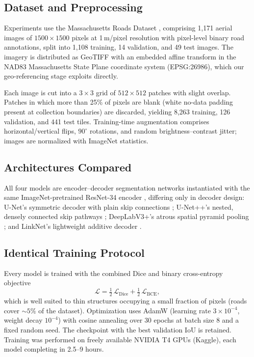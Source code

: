 \documentclass[conference]{IEEEtran}
\begin{document}
\subsection{Dataset and Preprocessing}
Experiments use the Massachusetts Roads Dataset \cite{mnih2013thesis},
comprising 1{,}171 aerial images of $1500\times1500$ pixels at 1\,m/pixel
resolution with pixel-level binary road annotations, split into 1{,}108
training, 14 validation, and 49 test images. The imagery is distributed as
GeoTIFF with an embedded affine transform in the NAD83 Massachusetts State
Plane coordinate system (EPSG:26986), which our geo-referencing stage exploits
directly.

Each image is cut into a $3\times3$ grid of $512\times512$ patches with slight
overlap. Patches in which more than 25\% of pixels are blank (white no-data
padding present at collection boundaries) are discarded, yielding 8{,}263
training, 126 validation, and 441 test tiles. Training-time augmentation
comprises horizontal/vertical flips, $90^{\circ}$ rotations, and random
brightness--contrast jitter; images are normalized with ImageNet statistics.

\subsection{Architectures Compared}
All four models are encoder--decoder segmentation networks instantiated with
the same ImageNet-pretrained ResNet-34 encoder \cite{he2016resnet}, differing
only in decoder design: U-Net's symmetric decoder with plain skip connections
\cite{ronneberger2015unet}; U-Net++'s nested, densely connected skip pathways
\cite{zhou2018unetpp}; DeepLabV3+'s atrous spatial pyramid pooling
\cite{chen2018deeplabv3plus}; and LinkNet's lightweight additive decoder
\cite{chaurasia2017linknet}.

\subsection{Identical Training Protocol}
Every model is trained with the combined Dice and binary cross-entropy
objective
\begin{equation}
\mathcal{L} = \tfrac{1}{2}\,\mathcal{L}_{\mathrm{Dice}} +
              \tfrac{1}{2}\,\mathcal{L}_{\mathrm{BCE}},
\end{equation}
which is well suited to thin structures occupying a small fraction of pixels
(roads cover ${\sim}5\%$ of the dataset). Optimization uses AdamW (learning
rate $3\times10^{-4}$, weight decay $10^{-4}$) with cosine annealing over 30
epochs at batch size 8 and a fixed random seed. The checkpoint with the best
validation IoU is retained. Training was performed on freely available NVIDIA
T4 GPUs (Kaggle), each model completing in 2.5--9 hours.
\end{document}
